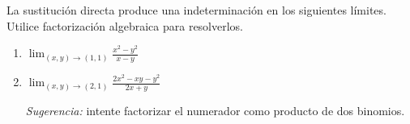 La sustitución directa produce una indeterminación en los siguientes límites. Utilice factorización algebraica para resolverlos.
\begin{enumerate}
    \item $\displaystyle\lim_{(x,y) \to (1,1)} \frac{x^2 - y^2}{x - y}$
    \item $\displaystyle\lim_{(x,y) \to (2,1)} \frac{2x^2 - xy - y^2}{2x + y}$

    \textit{Sugerencia:} intente factorizar el numerador como producto de dos binomios.
\end{enumerate}
